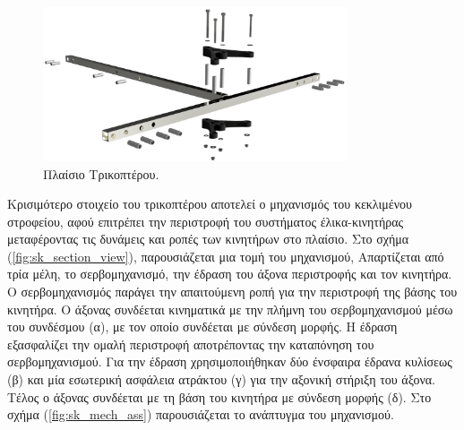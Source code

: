 \begin{figure}[H]
    \centering
    \includegraphics[width=0.8\textwidth]{Skoupa/Expl_Frame_3_edit.png}
    \caption{Πλαίσιο Τρικοπτέρου.}\label{fig:sk_frame}
\end{figure}

Κρισιμότερο στοιχείο του τρικοπτέρου αποτελεί ο μηχανισμός του
κεκλιμένου στροφείου, αφού επιτρέπει την περιστροφή του συστήματος
έλικα-κινητήρας μεταφέροντας τις δυνάμεις και ροπές των κινητήρων στο πλαίσιο.
Στο σχήμα (\ref{fig:sk_section_view}), παρουσιάζεται μια τομή του μηχανισμού,
Απαρτίζεται από τρία μέλη, το σερβομηχανισμό, την έδραση του άξονα περιστροφής 
και τον κινητήρα. Ο σερβομηχανισμός παράγει την απαιτούμενη ροπή για την
περιστροφή της βάσης του κινητήρα. Ο άξονας συνδέεται κινηματικά με την πλήμνη
του σερβομηχανισμού μέσω του συνδέσμου (α), με τον οποίο συνδέεται με σύνδεση 
μορφής. Η έδραση εξασφαλίζει την ομαλή περιστροφή αποτρέποντας την καταπόνηση 
του σερβομηχανισμού. Για την έδραση χρησιμοποιήθηκαν δύο ένσφαιρα έδρανα 
κυλίσεως (β) και μία εσωτερική ασφάλεια ατράκτου (γ) για την αξονική στήριξη του 
άξονα. Τέλος ο άξονας συνδέεται με τη βάση του κινητήρα με σύνδεση μορφής (δ).
Στο σχήμα (\ref{fig:sk_mech_ass}) παρουσιάζεται το ανάπτυγμα του μηχανισμού.

